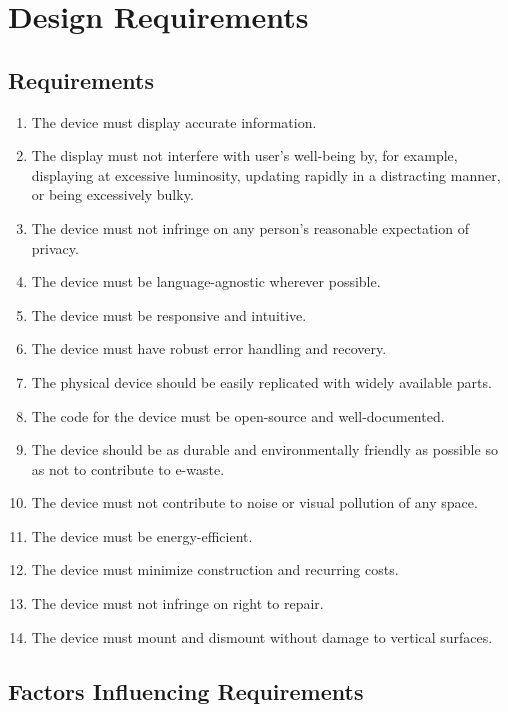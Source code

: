 \clearpage
\section{Design Requirements}
\subsection{Requirements}
\begin{enumerate}
      \item The device must display accurate information.
      \item The display must not interfere with
            user's well-being by, for example, displaying at
            excessive luminosity, updating rapidly
            in a distracting manner, or being
            excessively bulky.
      \item The device must not infringe on any person's
            reasonable expectation of privacy.
      \item The device must
            be language-agnostic wherever possible.
      \item The device must be responsive and intuitive.
      \item The device must have robust error handling and recovery.
      \item The physical device should be
            easily replicated with widely available
            parts.
      \item The code for the device must
            be open-source and well-documented.
      \item The device should be as durable and
            environmentally friendly as possible so as
            not to contribute to e-waste.
      \item The device must not contribute to noise
            or visual pollution of any space.
      \item The device must be energy-efficient.
      \item The device must minimize
            construction and recurring costs.
      \item The device must not infringe on
            right to repair.
      \item The device must mount and dismount without
            damage to vertical surfaces.
\end{enumerate}

\clearpage

\subsection{Factors Influencing Requirements}
